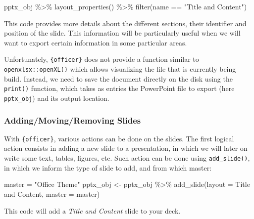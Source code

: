 \documentclass[
]{book}
\newenvironment{Shaded}{\begin{snugshade}}{\end{snugshade}}
\newcommand{\AttributeTok}[1]{\textcolor[rgb]{0.77,0.63,0.00}{#1}}
\newcommand{\FunctionTok}[1]{\textcolor[rgb]{0.00,0.00,0.00}{#1}}
\newcommand{\NormalTok}[1]{#1}
\newcommand{\OtherTok}[1]{\textcolor[rgb]{0.56,0.35,0.01}{#1}}
\newcommand{\SpecialCharTok}[1]{\textcolor[rgb]{0.00,0.00,0.00}{#1}}
\newcommand{\StringTok}[1]{\textcolor[rgb]{0.31,0.60,0.02}{#1}}
\begin{document}
\begin{Shaded}
\begin{Highlighting}[]
\NormalTok{pptx\_obj }\SpecialCharTok{\%\textgreater{}\%} 
  \FunctionTok{layout\_properties}\NormalTok{() }\SpecialCharTok{\%\textgreater{}\%} 
  \FunctionTok{filter}\NormalTok{(name }\SpecialCharTok{==} \StringTok{"Title and Content"}\NormalTok{)}
\end{Highlighting}
\end{Shaded}

This code provides more details about the different sections, their identifier and position of the slide. This information will be particularly useful when we will want to export certain information in some particular areas.

Unfortunately, \texttt{\{officer\}} does not provide a function similar to \texttt{openxlsx::openXL()} which allows visualizing the file that is currently being build. Instead, we need to save the document directly on the disk using the \texttt{print()} function, which takes as entries the PowerPoint file to export (here \texttt{pptx\_obj}) and its output location.

\hypertarget{addingmovingremoving-slides}{%
\subsubsection{Adding/Moving/Removing Slides}\label{addingmovingremoving-slides}}

With \texttt{\{officer\}}, various actions can be done on the slides. The first logical action consists in adding a new slide to a presentation, in which we will later on write some text, tables, figures, etc. Such action can be done using \texttt{add\_slide()}, in which we inform the type of slide to add, and from which master:

\begin{Shaded}
\begin{Highlighting}[]
\NormalTok{master }\OtherTok{=} \StringTok{"Office Theme"}
\NormalTok{pptx\_obj }\OtherTok{\textless{}{-}}\NormalTok{ pptx\_obj }\SpecialCharTok{\%\textgreater{}\%} 
  \FunctionTok{add\_slide}\NormalTok{(}\AttributeTok{layout =} \StringTok{\textquotesingle{}Title and Content\textquotesingle{}}\NormalTok{, }\AttributeTok{master =}\NormalTok{ master)}
\end{Highlighting}
\end{Shaded}

This code will add a \emph{Title and Content} slide to your deck.
\end{document}
